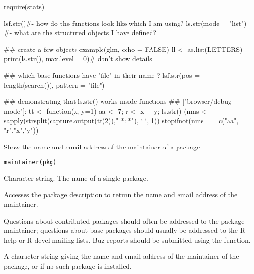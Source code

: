 %
\begin{Examples}
\begin{ExampleCode}
require(stats)

lsf.str()#- how do the functions look like which I am using?
ls.str(mode = "list") #- what are the structured objects I have defined?

## create a few objects
example(glm, echo = FALSE)
ll <- as.list(LETTERS)
print(ls.str(), max.level = 0)# don't show details

## which base functions have "file" in their name ?
lsf.str(pos = length(search()), pattern = "file")

## demonstrating that  ls.str() works inside functions
## ["browser/debug mode"]:
tt <- function(x, y=1) { aa <- 7; r <- x + y; ls.str() }
(nms <- sapply(strsplit(capture.output(tt(2))," *: *"), `[`, 1))
stopifnot(nms == c("aa", "r","x","y"))
\end{ExampleCode}
\end{Examples}
%
\begin{Description}\relax
Show the name and email address of the maintainer of a package.
\end{Description}
%
\begin{Usage}
\begin{verbatim}
maintainer(pkg)
\end{verbatim}
\end{Usage}
%
\begin{Arguments}
\begin{ldescription}
\item[\code{pkg}] Character string.  The name of a single package.
\end{ldescription}
\end{Arguments}
%
\begin{Details}\relax
Accesses the package description to return the name and email address of
the maintainer.  

Questions about contributed packages should often be addressed to
the package maintainer; questions about base packages should
usually be addressed to the R-help or R-devel mailing lists.  Bug
reports should be submitted using the 
function.
\end{Details}
%
\begin{Value}
A character string giving the name and email address of the maintainer
of the package, or  if no such package is installed.
\end{Value}
